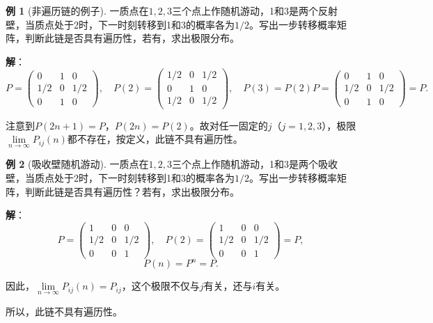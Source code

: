 \documentclass[11pt,a4paper]{report}
\theoremstyle{definition}
\newtheorem{example}{例}[chapter]
\begin{document}
\begin{example}[非遍历链的例子]
一质点在$1,2,3$三个点上作随机游动，1和3是两个反射壁，当质点处于2时，下一时刻转移到1和3的概率各为$1/2$。写出一步转移概率矩阵，判断此链是否具有遍历性，若有，求出极限分布。

\textbf{解}：
\[
P=
\begin{pmatrix}
0 & 1 & 0\\
1/2 & 0 & 1/2\\
0 & 1 & 0
\end{pmatrix},
\quad
P(2)=
\begin{pmatrix}
1/2 & 0 & 1/2\\
0 & 1 & 0\\
1/2 & 0 & 1/2
\end{pmatrix},
\quad
P(3)=P(2)P=
\begin{pmatrix}
0 & 1 & 0\\
1/2 & 0 & 1/2\\
0 & 1 & 0
\end{pmatrix}=P.
\]

注意到$P(2n+1)=P$，$P(2n)=P(2)$。故对任一固定的$j$（$j=1,2,3$），极限$\lim\limits_{n\to\infty}P_{ij}(n)$都不存在，按定义，此链不具有遍历性。
\end{example}

\begin{example}[吸收壁随机游动]
一质点在$1,2,3$三个点上作随机游动，1和3是两个吸收壁，当质点处于2时，下一时刻转移到1和3的概率各为$1/2$。写出一步转移概率矩阵，判断此链是否具有遍历性？若有，求出极限分布。

\textbf{解}：
\[
P=
\begin{pmatrix}
1 & 0 & 0\\
1/2 & 0 & 1/2\\
0 & 0 & 1
\end{pmatrix},
\quad
P(2)=
\begin{pmatrix}
1 & 0 & 0\\
1/2 & 0 & 1/2\\
0 & 0 & 1
\end{pmatrix}=P,
\]
\[
P(n)=P^n=P.
\]

因此，$\lim\limits_{n\to\infty}P_{ij}(n)=P_{ij}$，这个极限不仅与$j$有关，还与$i$有关。

所以，此链不具有遍历性。
\end{example}
\end{document}
